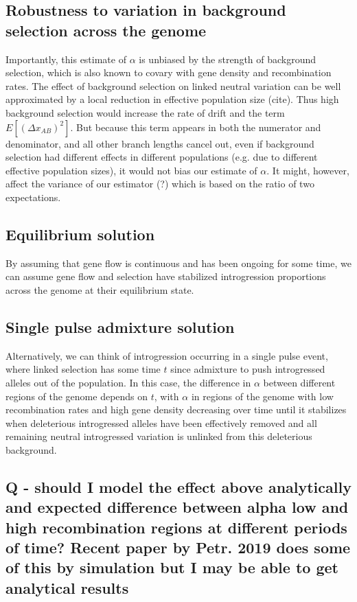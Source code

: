 \documentclass[12pt]{report}
\begin{document}
\subsection{Robustness to variation in background selection across the genome}
Importantly, this estimate of $\alpha$ is unbiased by the strength of background selection, which is also known to covary with gene density and recombination rates. The effect of background selection on linked neutral variation can be well approximated by a local reduction in effective population size (cite). Thus high background selection would increase the rate of drift and the term $E[(\Delta{x_{AB}})^2]$. But because this term appears in both the numerator and denominator, and all other branch lengths cancel out, even if background selection had different effects in different populations (e.g. due to different effective population sizes), it would not bias our estimate of $\alpha$. It might, however, affect the variance of our estimator (?) which is based on the ratio of two expectations.

\subsection{Equilibrium solution}
By assuming that gene flow is continuous and has been ongoing for some time, we can assume gene flow and selection have stabilized introgression proportions across the genome at their equilibrium state.

\subsection{Single pulse admixture solution}
Alternatively, we can think of introgression occurring in a single pulse event, where linked selection has some time $t$ since admixture to push introgressed alleles out of the population. In this case, the difference in $\alpha$ between different regions of the genome depends on $t$, with $\alpha$ in regions of the genome with low recombination rates and high gene density decreasing over time until it stabilizes when deleterious introgressed alleles have been effectively removed and all remaining neutral introgressed variation is unlinked from this deleterious background.
\subsection{Q - should I model the effect above analytically and expected difference between alpha low and high recombination regions at different periods of time? Recent paper by Petr. 2019 does some of this by simulation but I may be able to get analytical results}
\end{document}
